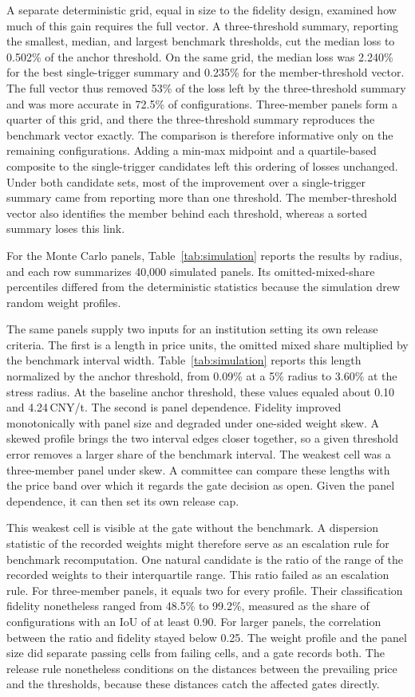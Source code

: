 A separate deterministic grid, equal in size to the fidelity design, examined how much of this gain requires the full vector. A three-threshold summary, reporting the smallest, median, and largest benchmark thresholds, cut the median loss to 0.502\% of the anchor threshold. On the same grid, the median loss was 2.240\% for the best single-trigger summary and 0.235\% for the member-threshold vector. The full vector thus removed 53\% of the loss left by the three-threshold summary and was more accurate in 72.5\% of configurations. Three-member panels form a quarter of this grid, and there the three-threshold summary reproduces the benchmark vector exactly. The comparison is therefore informative only on the remaining configurations. Adding a min-max midpoint and a quartile-based composite to the single-trigger candidates left this ordering of losses unchanged. Under both candidate sets, most of the improvement over a single-trigger summary came from reporting more than one threshold. The member-threshold vector also identifies the member behind each threshold, whereas a sorted summary loses this link.

For the Monte Carlo panels, Table~\ref{tab:simulation} reports the results by radius, and each row summarizes 40,000 simulated panels. Its omitted-mixed-share percentiles differed from the deterministic statistics because the simulation drew random weight profiles.

The same panels supply two inputs for an institution setting its own release criteria. The first is a length in price units, the omitted mixed share multiplied by the benchmark interval width. Table~\ref{tab:simulation} reports this length normalized by the anchor threshold, from 0.09\% at a 5\% radius to 3.60\% at the stress radius. At the baseline anchor threshold, these values equaled about 0.10 and 4.24\,CNY/t. The second is panel dependence. Fidelity improved monotonically with panel size and degraded under one-sided weight skew. A skewed profile brings the two interval edges closer together, so a given threshold error removes a larger share of the benchmark interval. The weakest cell was a three-member panel under skew. A committee can compare these lengths with the price band over which it regards the gate decision as open. Given the panel dependence, it can then set its own release cap.

This weakest cell is visible at the gate without the benchmark. A dispersion statistic of the recorded weights might therefore serve as an escalation rule for benchmark recomputation. One natural candidate is the ratio of the range of the recorded weights to their interquartile range. This ratio failed as an escalation rule. For three-member panels, it equals two for every profile. Their classification fidelity nonetheless ranged from 48.5\% to 99.2\%, measured as the share of configurations with an IoU of at least 0.90. For larger panels, the correlation between the ratio and fidelity stayed below 0.25. The weight profile and the panel size did separate passing cells from failing cells, and a gate records both. The release rule nonetheless conditions on the distances between the prevailing price and the thresholds, because these distances catch the affected gates directly.

